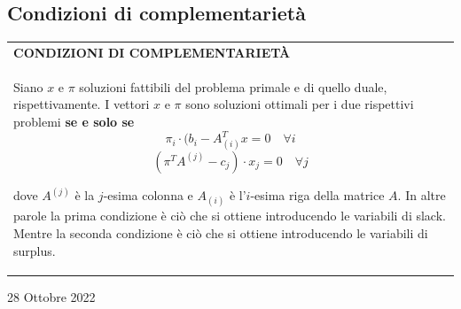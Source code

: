 \documentclass[a4paper]{extarticle}
\renewcommand\arraystretch{}
\begin{document}
\vspace{1em}
\noindent
\subsection{Condizioni di complementarietà}

\vspace{1em}
\setlength{\tabcolsep}{14pt}
\renewcommand{\arraystretch}{2}
\noindent
\begin{tabularx}{\textwidth}{@{}|P|@{}}
    \hline
    {\textbf{CONDIZIONI DI COMPLEMENTARIETÀ}}\\
    \parbox{\linewidth}{Siano $x$ e $\pi$ soluzioni fattibili del problema primale e di quello duale, rispettivamente. I vettori $x$ e $\pi$ sono soluzioni ottimali per i due rispettivi problemi \textbf{se e solo se}
    \[\pi_i \cdot (b_i -A_{(i)}^T x = 0 \hspace{1em} \forall i\]
    \[(\pi^TA^{(j)}-c_j) \cdot x_j = 0 \hspace{1em} \forall j\]

    dove $A^{(j)}$ è la $j$-esima colonna e $A_{(i)}$ è l'$i$-esima riga della matrice $A$.\\
    In altre parole la prima condizione è ciò che si ottiene introducendo le variabili di slack. Mentre la seconda condizione è ciò che si ottiene introducendo le variabili di surplus.
    \vspace{3mm}}\\
    \hline
\end{tabularx}

\newpage
\begin{center}
    28 Ottobre 2022
\end{center}
\end{document}
